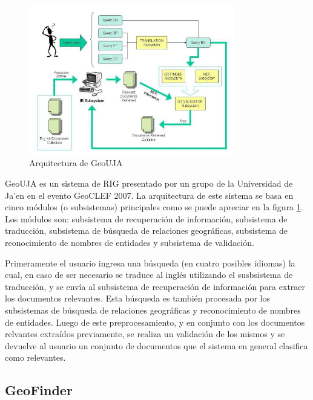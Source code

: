\begin{figure}[htb]%
	\begin{center}
		\includegraphics[width=0.8\textwidth]{geouja_arch.jpg}
	\end{center}
	\caption{Arquitectura de GeoUJA \cite{perea2007}}
	\label{fig:archgeouja}
\end{figure}

GeoUJA \cite{perea2007} es un sistema de RIG presentado por un grupo de la
Universidad de Ja'en en el evento GeoCLEF 2007. La arquitectura de este sistema
se basa en cinco módulos (o subsistemas) principales como se puede apreciar en
la figura \ref{fig:archgeouja}. Los módulos son: subsistema de recuperación de
información, subsistema de traducción, subsistema de búsqueda de relaciones
geográficas, subsistema de reonocimiento de nombres de entidades y subsistema
de validación.

Primeramente el usuario ingresa una búsqueda (en cuatro posibles idiomas) la
cual, en caso de ser necesario se traduce al inglés utilizando el susbsistema
de traducción, y se envía al subsistema de recuperación de información para
extraer los documentos relevantes. Esta búsqueda es también procesada por los
subsistemas de búsqueda de relaciones geográficas y reconocimiento de nombres de
entidades. Luego de este preprocesamiento, y en conjunto con los documentos
relvantes extraídos previamente, se realiza un validación de los mismos y se
devuelve al usuario un conjunto de documentos que el sistema en general
clasifica como relevantes.

\clearpage

\subsection{GeoFinder}\label{sec:archgeofinder}

